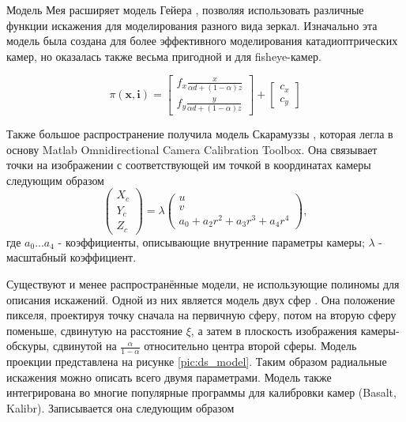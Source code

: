 Модель Мея \cite{mei} расширяет модель Гейера \cite{geyer}, позволяя использовать различные функции искажения 
для моделирования разного вида зеркал. Изначально эта модель была создана для более эффективного моделирования 
катадиоптрических камер, но оказалась также весьма пригодной и для fisheye-камер. 

\begin{equation}
\pi(\mathbf{x}, \mathbf{i})=\left[\begin{array}{l}
	f_{x} \frac{x}{\alpha d+(1-\alpha) z} \\
	f_{y} \frac{y}{\alpha d+(1-\alpha) z}
	\end{array}\right]+\left[\begin{array}{l}
	c_{x} \\
	c_{y}
	\end{array}\right]
\end{equation}

Также большое распространение получила модель Скарамуззы \cite{scaramuzza}, которая легла в основу Matlab Omnidirectional 
Camera Calibration Toolbox. Она связывает точки на изображении с соответствующей им точкой в координатах камеры
следующим образом
\begin{equation}	
    \begin{pmatrix}X_c\\Y_c\\Z_c\end{pmatrix} = \lambda \begin{pmatrix}u\\v\\a_0 + a_2 r^2 + a_3 r^3 + a_4 r^4\end{pmatrix},
    \label{eqn:scaramuzza}
\end{equation}
где $a_0 ... a_4$ - коэффициенты, описывающие внутренние параметры камеры; $\lambda$ - масштабный коэффициент.


Существуют и менее распространённые модели, не использующие полиномы для описания искажений. Одной из них является
модель двух сфер \cite{double_sphere}. %
Она положение пикселя, проектируя точку сначала на первичную сферу, потом на вторую сферу поменьше, сдвинутую на 
расстояние $\xi$, а затем в плоскость изображения камеры-обскуры, сдвинутой на $\frac{\alpha}{1-\alpha}$ относительно 
центра второй сферы. Модель проекции представлена на рисунке \ref{pic:ds_model}. Таким образом радиальные искажения 
можно описать всего двумя параметрами. Модель также интегрирована
во многие популярные программы для калибровки камер (Basalt, Kalibr). Записывается она следующим образом

